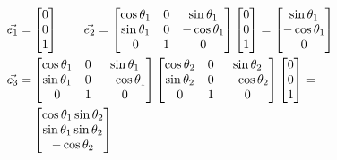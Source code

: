 \documentclass[conference]{IEEEtran}
\begin{document}
\begin{align*}
    \vec{e_1} =                     & \begin{bmatrix}
                                          0 \\
                                          0 \\
                                          1
                                      \end{bmatrix} \hspace{20px}
    \vec{e_2} = \begin{bmatrix}
                    \cos \theta_1 & 0 & \sin \theta_1   \\
                    \sin \theta_1 & 0 & - \cos \theta_1 \\
                    0             & 1 & 0
                \end{bmatrix}
    \begin{bmatrix}
        0 \\
        0 \\
        1
    \end{bmatrix} = \begin{bmatrix}
                        \sin \theta_1  \\
                        -\cos \theta_1 \\
                        0
                    \end{bmatrix} &                                       \\
    \vec{e_3} =                     & \begin{bmatrix}
                                          \cos \theta_1 & 0 & \sin \theta_1   \\
                                          \sin \theta_1 & 0 & - \cos \theta_1 \\
                                          0             & 1 & 0
                                      \end{bmatrix}
    \begin{bmatrix}
        \cos \theta_2 & 0 & \sin \theta_2   \\
        \sin \theta_2 & 0 & - \cos \theta_2 \\
        0             & 1 & 0
    \end{bmatrix}
    \begin{bmatrix}
        0 \\
        0 \\
        1
    \end{bmatrix} =                                                       \\
                                    & \begin{bmatrix}
                                          \cos \theta_1 \sin \theta_2 \\
                                          \sin \theta_1 \sin \theta_2 \\
                                          - \cos \theta_2
                                      \end{bmatrix}         &
\end{align*}
\end{document}
